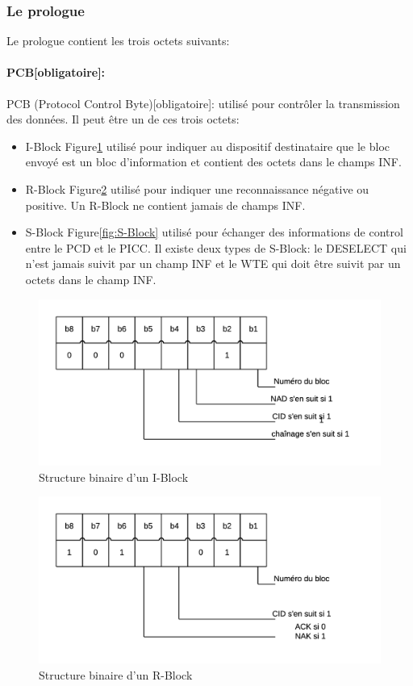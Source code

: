 \documentclass{themeensg}
\begin{document}
\subsubsection{Le prologue}
Le prologue contient les trois octets suivants:
\paragraph{PCB[obligatoire]:}
PCB (Protocol Control Byte)[obligatoire]: utilisé pour contrôler la transmission des données. Il peut être un de ces trois octets:
\begin{itemize}
\item I-Block Figure\ref{fig:I-Block} utilisé pour indiquer au dispositif destinataire que le bloc envoyé est un bloc d'information et contient des octets dans le champs INF.
\item R-Block Figure\ref{fig:R-Block} utilisé pour indiquer une reconnaissance négative ou positive. Un R-Block ne contient jamais de champs INF.
\item S-Block Figure\ref{fig:S-Block} utilisé pour échanger des informations de control entre le PCD et le PICC. Il existe deux types de S-Block: le DESELECT qui n'est jamais suivit par un champ INF et le WTE qui doit être suivit par un octets dans le champ INF.
\end{itemize}

\begin{figure}[h!]
\centering
\includegraphics[scale=1]{images/iblock.png}
\caption{Structure binaire d'un I-Block}
\label{fig:I-Block}
\end{figure}

\begin{figure}[h!]
\centering
\includegraphics[scale=1]{images/rblock.png}
\caption{Structure binaire d'un R-Block}
\label{fig:R-Block}
\end{figure}
\end{document}

